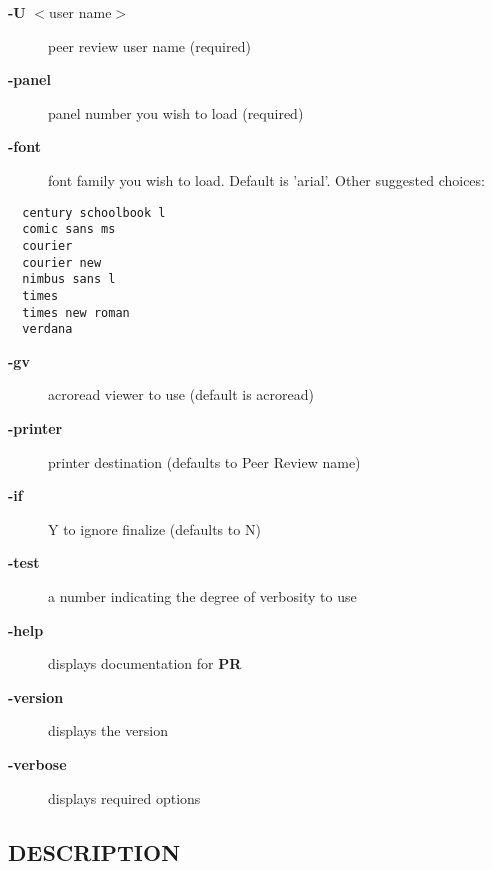 \documentclass{article}
\begin{document}
\begin{description}

\item[{\textbf{-U} $<$user name$>$}] \mbox{}

peer review user name (required)


\item[{\textbf{-panel}}] \mbox{}

panel number you wish to load (required)


\item[{\textbf{-font}}] \mbox{}

font family you wish to load.
Default is 'arial'.  Other suggested choices:

\end{description}
\begin{verbatim}
  century schoolbook l
  comic sans ms
  courier
  courier new
  nimbus sans l
  times
  times new roman
  verdana
\end{verbatim}
\begin{description}

\item[{\textbf{-gv}}] \mbox{}

acroread viewer to use (default is acroread)


\item[{\textbf{-printer}}] \mbox{}

printer destination (defaults to Peer Review name)


\item[{\textbf{-if}}] \mbox{}

Y to ignore finalize (defaults to N)


\item[{\textbf{-test}}] \mbox{}

a number indicating the degree of verbosity to use


\item[{\textbf{-help}}] \mbox{}

displays documentation for \textbf{PR}


\item[{\textbf{-version}}] \mbox{}

displays the version


\item[{\textbf{-verbose}}] \mbox{}

displays required options

\end{description}
\subsection*{DESCRIPTION\label{PR_DESCRIPTION}}
\end{document}
